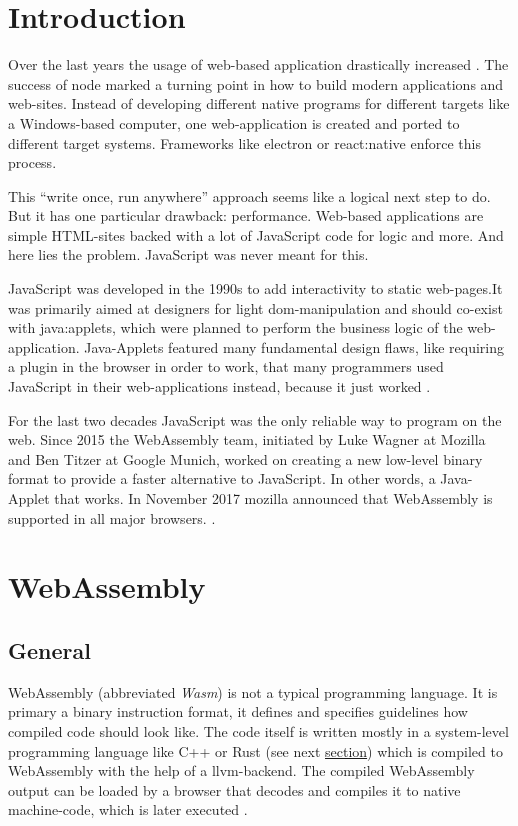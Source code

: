 
\section{Introduction}
Over the last years the usage of web-based application drastically increased \cite[cf.][]{stackoverflow:survey}. The success of \gls{node} marked a turning point in how to build modern applications and web-sites. Instead of developing different native programs for different targets like a Windows-based computer, one web-application is created and ported to different target systems. Frameworks like \gls{electron} or \gls{react:native} enforce this process.

This ``write once, run anywhere'' approach seems like a logical next step to do. But it has one particular drawback: performance. Web-based applications are simple HTML-sites backed with a lot of JavaScript code for logic and more. And here lies the problem. JavaScript was never meant for this.

JavaScript was developed in the 1990s to add interactivity to static web-pages.It was primarily aimed at designers for light \gls{dom}-manipulation and should co-exist with \glspl{java:applet}, which were planned to perform the business logic of the web-application. Java-Applets featured many fundamental design flaws, like requiring a plugin in the browser in order to work, that many programmers used JavaScript in their web-applications instead, because it just worked \cite{js:history, wasm:explanation, javaapplet:history}.

For the last two decades JavaScript was the only reliable way to program on the web. Since 2015 the WebAssembly team, initiated by Luke Wagner at Mozilla and Ben Titzer at Google Munich, worked on creating a new low-level binary format to provide a faster alternative to JavaScript. In other words, a Java-Applet that works. In November 2017 \gls{mozilla} announced that WebAssembly is supported in all major browsers. \cite{wasm:revolution, wasm:support}.  

\section{WebAssembly}

\subsection{General}
WebAssembly (abbreviated \textit{Wasm}) is not a typical programming language. It is primary a binary instruction format, it defines and specifies guidelines how compiled code should look like. The code itself is written mostly in a system-level programming language like C++ or Rust (see next \hyperref[sec:rust]{section}) which is compiled to WebAssembly with the help of a \gls{llvm}-backend. The compiled WebAssembly output can be loaded by a browser that decodes and compiles it to native machine-code, which is later executed \cite{wasm:basics, wasm:howandwhy}.

